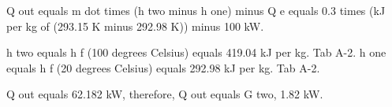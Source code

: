 Q out equals m dot times (h two minus h one) minus Q e equals 0.3 times (kJ per kg of (293.15 K minus 292.98 K)) minus 100 kW.

h two equals h f (100 degrees Celsius) equals 419.04 kJ per kg. Tab A-2.
h one equals h f (20 degrees Celsius) equals 292.98 kJ per kg. Tab A-2.

Q out equals 62.182 kW, therefore, Q out equals G two, 1.82 kW.